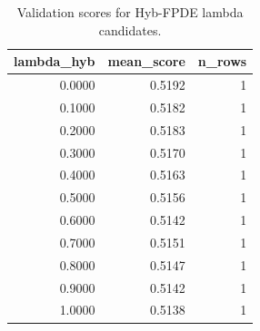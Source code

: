 \begin{table}[t]
\caption{Validation scores for Hyb-FPDE lambda candidates.}
\label{tab:lambda_distribution_computed}
\centering
\begin{tabular}{rrr}
\toprule
lambda\_hyb & mean\_score & n\_rows \\
\midrule
0.0000 & 0.5192 & 1 \\
0.1000 & 0.5182 & 1 \\
0.2000 & 0.5183 & 1 \\
0.3000 & 0.5170 & 1 \\
0.4000 & 0.5163 & 1 \\
0.5000 & 0.5156 & 1 \\
0.6000 & 0.5142 & 1 \\
0.7000 & 0.5151 & 1 \\
0.8000 & 0.5147 & 1 \\
0.9000 & 0.5142 & 1 \\
1.0000 & 0.5138 & 1 \\
\bottomrule
\end{tabular}

\end{table}
